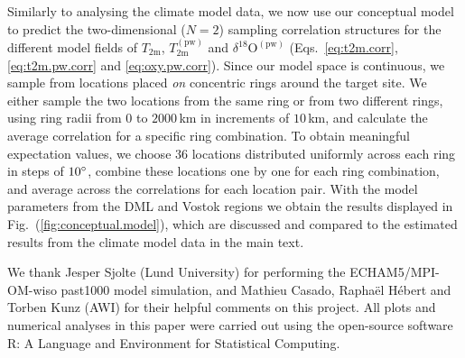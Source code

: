 \documentclass[cp, manuscript]{copernicus}
\begin{document}
Similarly to analysing the climate model data, we now use our conceptual model
to predict the two-dimensional ($N=2$) sampling correlation structures for the
different model fields of $T_{\mathrm{2m}}$, $T_{\mathrm{2m}}^{\mathrm{(pw)}}$
and $\delta^{18}\mathrm{O}^{\mathrm{(pw)}}$ (Eqs.~\ref{eq:t2m.corr},
\ref{eq:t2m.pw.corr} and \ref{eq:oxy.pw.corr}). Since our model space is
continuous, we sample from locations placed \emph{on} concentric rings around
the target site. We either sample the two locations from the same ring or from
two different rings, using ring radii from $0$ to $2000$\,km in increments of
$10$\,km, and calculate the average correlation for a specific ring
combination. To obtain meaningful expectation values, we choose $36$ locations
distributed uniformly across each ring in steps of $10^{\circ}$, combine
these locations one by one for each ring combination, and average across the
correlations for each location pair. With the model parameters from the DML and
Vostok regions we obtain the results displayed in
Fig.~(\ref{fig:conceptual.model}), which are discussed and compared to the
estimated results from the climate model data in the main text.

\noappendix


\begin{acknowledgements}
We thank Jesper Sjolte (Lund University) for performing the ECHAM5/MPI-OM-wiso
past1000 model simulation, and Mathieu Casado, Rapha\"{e}l H\'{e}bert and Torben
Kunz (AWI) for their helpful comments on this project. All plots and numerical
analyses in this paper were carried out using the open-source software R: A
Language and Environment for Statistical Computing.
\end{acknowledgements}



\end{document}
